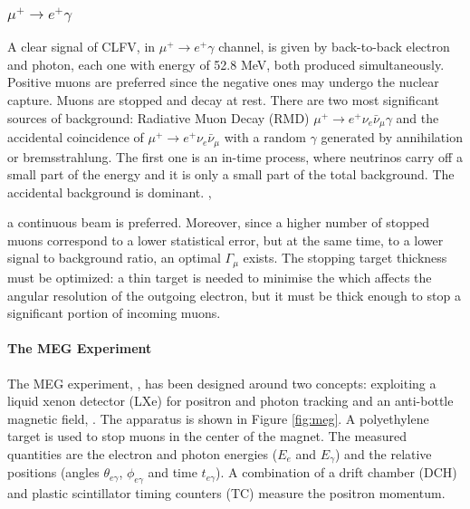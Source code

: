 \subsubsection{$\mu^+ \rightarrow e^+ \gamma$}
A clear signal of CLFV, in $\mu^+ \rightarrow e^+ \gamma$ channel, is given by back-to-back electron and photon, each one with energy of 52.8 MeV, 
both produced simultaneously. Positive muons are preferred since the negative ones may undergo the nuclear capture. 
Muons are stopped and decay at rest. There are two most significant sources of background: 
Radiative Muon Decay (RMD) $\mu^+ \rightarrow e^+ \nu_e \bar{\nu}_\mu \gamma$ 
and the accidental coincidence of $\mu^+ \rightarrow e^+ \nu_e \bar{\nu}_\mu$ with a random $\gamma$ 
generated by annihilation or bremsstrahlung. The first one is an in-time process, 
where neutrinos carry off a small part of the energy 
and it is only a small part of the total background. The accidental background 
is dominant. ,

a continuous beam is preferred.
Moreover, since a higher number of stopped muons correspond to a lower statistical error, but at the same time, to a lower signal to background ratio, an optimal $\Gamma_\mu$ exists.
The stopping target thickness must be optimized: a thin target is needed to minimise
the 
\del{,} which affects the angular resolution of the outgoing electron, but 
it must be thick enough to stop a significant portion of incoming muons. 
\paragraph{The MEG Experiment}
The MEG experiment, \cite{megi}, has been designed around two concepts: exploiting a liquid
xenon detector (LXe) for positron and photon tracking and an anti-bottle magnetic field, \cite{clfv_signorelli}. 
The apparatus is shown in Figure \ref{fig:meg}. A polyethylene target is used to stop muons in the center of the magnet. 
The measured quantities are the electron and photon energies ($E_e$ and $E_\gamma$) and the
relative positions (angles $\theta_{e\gamma}$, $\phi_{e\gamma}$ and time $t_{e \gamma}$).
A combination of a drift chamber (DCH) and plastic scintillator timing counters (TC) measure the positron momentum.

